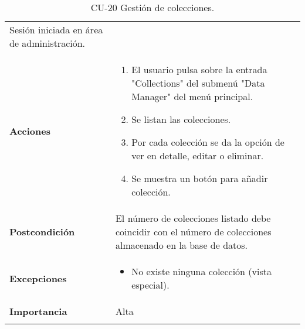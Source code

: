 \begin{longtable}[]{@{}ll@{}}
\begin{minipage}[t]{0.76\columnwidth}
Sesión iniciada en área de administración.\strut
\end{minipage}\tabularnewline
\begin{minipage}[t]{0.18\columnwidth}\raggedright
\textbf{Acciones}\strut
\end{minipage} & \begin{minipage}[t]{0.76\columnwidth}\raggedright
\begin{enumerate}
\def\labelenumi{\arabic{enumi}.}
\tightlist
\item
  El usuario pulsa sobre la entrada "Collections" del submenú "Data
  Manager" del menú principal.
\item
  Se listan las colecciones.
\item
  Por cada colección se da la opción de ver en detalle, editar o
  eliminar.
\item
  Se muestra un botón para añadir colección.
\end{enumerate}\strut
\end{minipage}\tabularnewline
\begin{minipage}[t]{0.18\columnwidth}\raggedright
\textbf{Postcondición}\strut
\end{minipage} & \begin{minipage}[t]{0.76\columnwidth}\raggedright
El número de colecciones listado debe coincidir con el número de
colecciones almacenado en la base de datos.\strut
\end{minipage}\tabularnewline
\begin{minipage}[t]{0.18\columnwidth}\raggedright
\textbf{Excepciones}\strut
\end{minipage} & \begin{minipage}[t]{0.76\columnwidth}\raggedright
\begin{itemize}
\tightlist
\item
  No existe ninguna colección (vista especial).
\end{itemize}\strut
\end{minipage}\tabularnewline
\begin{minipage}[t]{0.18\columnwidth}\raggedright
\textbf{Importancia}\strut
\end{minipage} & \begin{minipage}[t]{0.76\columnwidth}\raggedright
Alta\strut
\end{minipage}\tabularnewline
\bottomrule
\caption{CU-20 Gestión de colecciones.}
\end{longtable}


